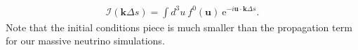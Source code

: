 \documentclass[useAMS, usenatbib]{mnras}
\newcommand{\beq}{\begin{equation}}
\newcommand{\eeq}{\end{equation}}
\newcommand{\barr}{\begin{eqnarray}}
\newcommand{\earr}{\end{eqnarray}}
\newcommand{\rme}{\textrm{e}}
\newcommand{\bs}{\boldsymbol}
\newcommand{\spb}[1]{{\textcolor{green}{[{\bf SPB}: #1]}}}
\begin{document}
\barr
\mathcal{I}(\bs{k}\Delta s ) %
= \int d^3 u ~ f^0(\bs{u})~\rme^{- i \bs{u} \cdot \bs{k} \Delta s}. \label{eq:I(k)}
\earr
Note that the initial conditions piece is much smaller than the propagation term for our massive neutrino simulations.


%
%
\end{document}
